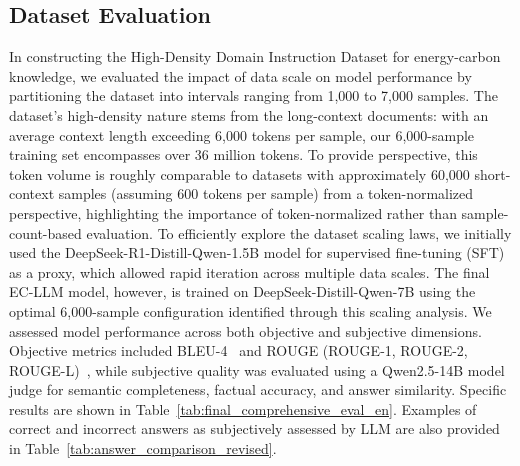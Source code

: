 \documentclass[]{interact}
\theoremstyle{plain}%
\theoremstyle{definition}
\theoremstyle{remark}
\begin{document}
\subsection{Dataset Evaluation}
In constructing the High-Density Domain Instruction Dataset for energy-carbon knowledge, we evaluated the impact of data scale on model performance by partitioning the dataset into intervals ranging from 1,000 to 7,000 samples. The dataset's high-density nature stems from the long-context documents: with an average context length exceeding 6,000 tokens per sample, our 6,000-sample training set encompasses over 36 million tokens. To provide perspective, this token volume is roughly comparable to datasets with approximately 60,000 short-context samples (assuming 600 tokens per sample) from a token-normalized perspective, highlighting the importance of token-normalized rather than sample-count-based evaluation. To efficiently explore the dataset scaling laws, we initially used the DeepSeek-R1-Distill-Qwen-1.5B model for supervised fine-tuning (SFT) as a proxy, which allowed rapid iteration across multiple data scales. The final EC-LLM model, however, is trained on DeepSeek-Distill-Qwen-7B using the optimal 6,000-sample configuration identified through this scaling analysis. We assessed model performance across both objective and subjective dimensions. Objective metrics included BLEU-4~\cite{papineni2002bleu} and ROUGE (ROUGE-1, ROUGE-2, ROUGE-L)~\cite{lin2004rouge}, while subjective quality was evaluated using a Qwen2.5-14B model judge for semantic completeness, factual accuracy, and answer similarity. Specific results are shown in Table~\ref{tab:final_comprehensive_eval_en}. Examples of correct and incorrect answers as subjectively assessed by LLM are also provided in Table~\ref{tab:answer_comparison_revised}.
\end{document}
